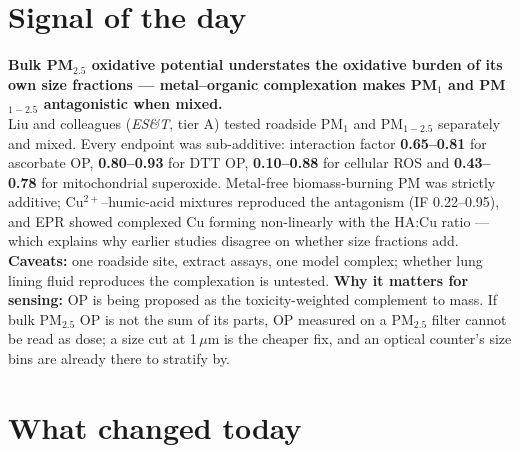 \documentclass[10pt]{article}
\begin{document}
\vspace{6mm}

\section*{\sffamily\bfseries\color{Deep}Signal of the day}
\vspace{-1.5mm}{\color{Amber}\rule{\linewidth}{1.1pt}}\vspace{2.5mm}

\begin{keybox}
{\sffamily\bfseries\small\color{Deep}Bulk PM$_{2.5}$ oxidative potential understates the oxidative
burden of its own size fractions --- metal--organic complexation makes PM$_1$ and PM$_{1-2.5}$ antagonistic
when mixed.}\\[1.4mm]
\footnotesize
Liu and colleagues (\textit{ES\&T}, tier A) tested roadside PM$_1$ and PM$_{1-2.5}$ separately and mixed. Every
endpoint was sub-additive: interaction factor \textbf{0.65--0.81} for ascorbate OP, \textbf{0.80--0.93} for DTT
OP, \textbf{0.10--0.88} for cellular ROS and \textbf{0.43--0.78} for mitochondrial superoxide. Metal-free
biomass-burning PM was strictly additive; Cu$^{2+}$--humic-acid mixtures reproduced the antagonism (IF
0.22--0.95), and EPR showed complexed Cu forming non-linearly with the HA:Cu ratio --- which explains why
earlier studies disagree on whether size fractions add. \textbf{Caveats:} one roadside site, extract assays,
one model complex; whether lung lining fluid reproduces the complexation is untested. \textbf{Why it matters
for sensing:} OP is being proposed as the toxicity-weighted complement to mass. If bulk PM$_{2.5}$ OP is
not the sum of its parts, OP measured on a PM$_{2.5}$ filter cannot be read as dose; a size cut at 1\,$\mu$m
is the cheaper fix, and an optical counter's size bins are already there to stratify by.\par
\end{keybox}

\vspace{3mm}

\section*{\sffamily\bfseries\color{Deep}What changed today}
\vspace{-1.5mm}{\color{Amber}\rule{\linewidth}{1.1pt}}\vspace{2.5mm}
\end{document}
